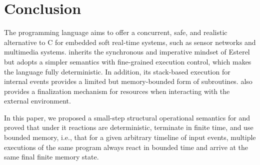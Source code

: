 \section{Conclusion}
\label{sec.conclusion}

The programming language \CEU aims to offer a concurrent, safe, and realistic
alternative to C for embedded soft real-time systems, such as sensor networks
and multimedia systems.
%
%
\CEU inherits the synchronous and imperative mindset of Esterel but adopts a
simpler semantics with fine-grained execution control, which makes the
language fully deterministic.
%
In addition, its stack-based execution for internal events provides a limited
but memory-bounded form of subroutines.
%
\CEU also provides a finalization mechanism for resources when interacting with
the external environment.

In this paper, we proposed a small-step structural operational semantics for
\CEU and proved that under it reactions are deterministic, terminate in
finite time, and use bounded memory, i.e., that for a given arbitrary
timeline of input events, multiple executions of the same program always
react in bounded time and arrive at the same final finite memory state.
